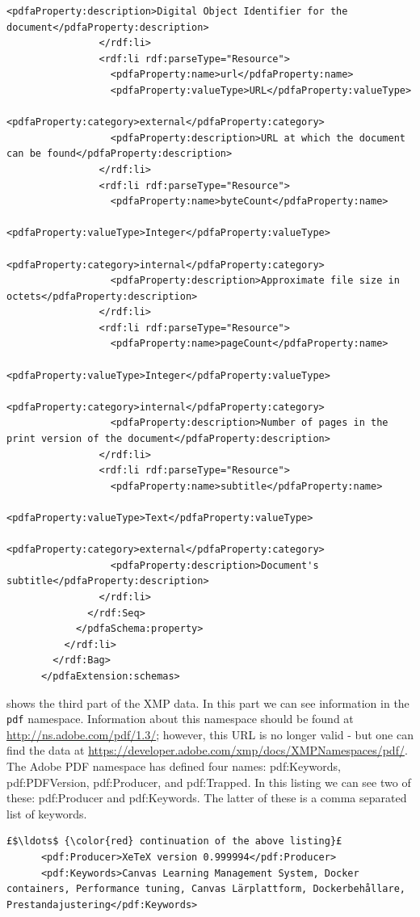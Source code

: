 \begin{lstlisting}[style=myXML,
caption={Second part of the XML metadata embedded in a PDF file (some reformatting has been done to fit the text in the boarders)}, label={lst:pdfinfoOutputPart2}]
                  <pdfaProperty:description>Digital Object Identifier for the document</pdfaProperty:description>
                </rdf:li>
                <rdf:li rdf:parseType="Resource">
                  <pdfaProperty:name>url</pdfaProperty:name>
                  <pdfaProperty:valueType>URL</pdfaProperty:valueType>
                  <pdfaProperty:category>external</pdfaProperty:category>
                  <pdfaProperty:description>URL at which the document can be found</pdfaProperty:description>
                </rdf:li>
                <rdf:li rdf:parseType="Resource">
                  <pdfaProperty:name>byteCount</pdfaProperty:name>
                  <pdfaProperty:valueType>Integer</pdfaProperty:valueType>
                  <pdfaProperty:category>internal</pdfaProperty:category>
                  <pdfaProperty:description>Approximate file size in octets</pdfaProperty:description>
                </rdf:li>
                <rdf:li rdf:parseType="Resource">
                  <pdfaProperty:name>pageCount</pdfaProperty:name>
                  <pdfaProperty:valueType>Integer</pdfaProperty:valueType>
                  <pdfaProperty:category>internal</pdfaProperty:category>
                  <pdfaProperty:description>Number of pages in the print version of the document</pdfaProperty:description>
                </rdf:li>
                <rdf:li rdf:parseType="Resource">
                  <pdfaProperty:name>subtitle</pdfaProperty:name>
                  <pdfaProperty:valueType>Text</pdfaProperty:valueType>
                  <pdfaProperty:category>external</pdfaProperty:category>
                  <pdfaProperty:description>Document's subtitle</pdfaProperty:description>
                </rdf:li>
              </rdf:Seq>
            </pdfaSchema:property>
          </rdf:li>
        </rdf:Bag>
      </pdfaExtension:schemas>
\end{lstlisting}

 shows the third part of the XMP data. In this part we can see information in the \texttt{pdf} namespace. Information about this namespace should be found at \url{http://ns.adobe.com/pdf/1.3/}; however, this URL is no longer valid - but one can find the data at \url{https://developer.adobe.com/xmp/docs/XMPNamespaces/pdf/}. The Adobe PDF namespace has defined four names: pdf:Keywords, pdf:PDFVersion, pdf:Producer, and pdf:Trapped. In this listing we can see two of these: pdf:Producer and pdf:Keywords. The latter of these is a comma separated list of keywords.
\begin{lstlisting}[style=myXML,
caption={The \texttt{pdf}-prefix metadata embedded in a PDF file (some reformatting has been done to fit the text in the boarders)}, label={lst:pdfinfoOutputPart3}]
£$\ldots$ {\color{red} continuation of the above listing}£ 
      <pdf:Producer>XeTeX version 0.999994</pdf:Producer>
      <pdf:Keywords>Canvas Learning Management System, Docker containers, Performance tuning, Canvas Lärplattform, Dockerbehållare, Prestandajustering</pdf:Keywords>
\end{lstlisting}

